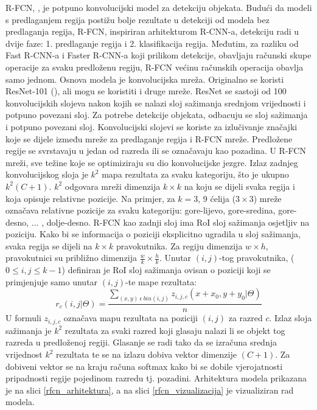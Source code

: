 R-FCN, \cite{DBLP:journals/corr/DaiLHS16}, je potpuno konvolucijski model za detekciju objekata. Budući da modeli s predlaganjem regija postižu bolje rezultate u detekciji od modela bez predlaganja regija, R-FCN, inspiriran arhitekturom R-CNN-a, detekciju radi u dvije faze: 1. predlaganje regija i 2. klasifikacija regija. Međutim, za razliku od Fast R-CNN-a i Faster R-CNN-a koji prilikom detekcije, obavljaju računski skupe operacije za svaku predloženu regiju, R-FCN većinu računskih operacija obavlja samo jednom.
Osnova modela je konvolucijska mreža. Originalno se koristi ResNet-101 (\cite{DBLP:journals/corr/HeZRS15}), ali mogu se koristiti i druge mreže. ResNet se sastoji od 100 konvolucijskih slojeva nakon kojih se nalazi sloj sažimanja srednjom vrijednosti i potpuno povezani sloj. Za potrebe detekcije objekata, odbacuju se sloj sažimanja i potpuno povezani sloj. Konvolucijski slojevi se koriste za izlučivanje značajki koje se dijele između mreže za predlaganje regija i R-FCN mreže. Predložene regije se svrstavaju u jedan od razreda ili se označavaju kao pozadina. U R-FCN mreži,  sve težine koje se optimiziraju su dio konvolucijske jezgre. Izlaz zadnjeg konvolucijskog sloja je $k^2$ mapa rezultata za svaku kategoriju, što je ukupno $k^2(C + 1)$. $k^2$ odgovara mreži dimenzija $k \times k$ na koju se dijeli svaka regija i koja opisuje relativne pozicije. Na primjer, za $k=3$, 9 ćelija ($3 \times 3$) mreže označava relativne pozicije za svaku kategoriju: gore-lijevo, gore-sredina, gore-desno, ... , dolje-desno. R-FCN kao zadnji sloj ima RoI sloj sažimanja osjetljiv na poziciju. Kako bi se informacija o poziciji eksplicitno ugradila u sloj sažimanja, svaka regija se dijeli na $k \times k$ pravokutnika. Za regiju dimenzija $w \times h$, pravokutnici su približno dimenzija $\frac{w}{k} \times \frac{h}{k}$. Unutar $(i, j)$-tog pravokutnika, ($0 \leq i, j \leq k - 1$) definiran je RoI sloj sažimanja ovisan o poziciji koji se primjenjuje samo unutar $(i, j)$-te mape rezultata:
\[
	r_c(i, j | \Theta) = \frac{\sum\limits_{(x,y) \ \epsilon \ bin(i, j)} z_{i, j, c}(x + x_0, y+ y_0 | \Theta)}{n}
\]
U formuli $z_{i,j,c}$ označava mapu rezultata na poziciji $(i, j)$ za razred $c$. Izlaz sloja sažimanja je $k^2$ rezultata za svaki razred koji glasaju nalazi li se objekt tog razreda u predloženoj regiji. Glasanje se radi tako da se izračuna srednja vrijednost $k^2$ rezultata te se na izlazu dobiva vektor dimenzije $(C + 1)$. Za dobiveni vektor se na kraju računa softmax kako bi se dobile vjerojatnosti pripadnosti regije pojedinom razredu tj. pozadini. Arhitektura modela prikazana je na slici \ref{rfcn_arhitektura}, a na slici \ref{rfcn_vizualizacija} je vizualiziran rad modela.
